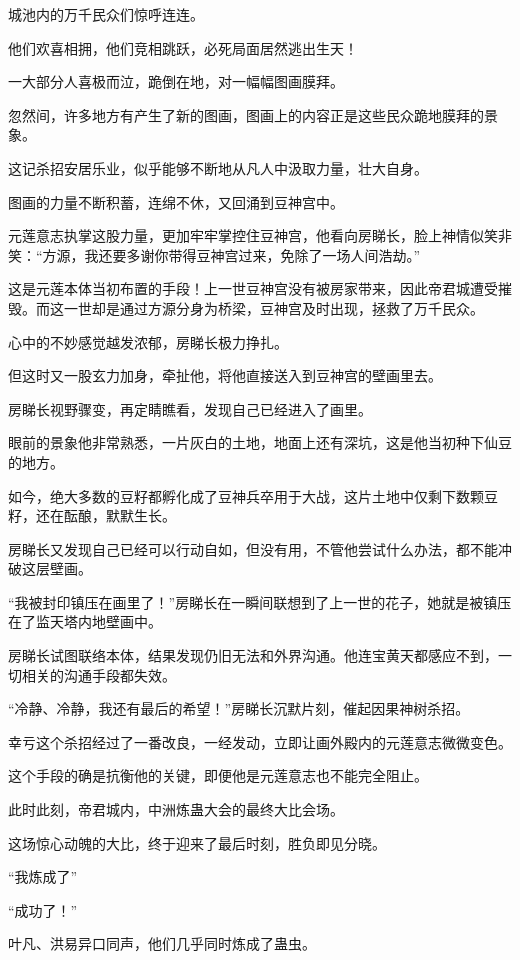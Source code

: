 \begin{this_body}
城池内的万千民众们惊呼连连。

他们欢喜相拥，他们竞相跳跃，必死局面居然逃出生天！

一大部分人喜极而泣，跪倒在地，对一幅幅图画膜拜。

忽然间，许多地方有产生了新的图画，图画上的内容正是这些民众跪地膜拜的景象。

这记杀招安居乐业，似乎能够不断地从凡人中汲取力量，壮大自身。

图画的力量不断积蓄，连绵不休，又回涌到豆神宫中。

元莲意志执掌这股力量，更加牢牢掌控住豆神宫，他看向房睇长，脸上神情似笑非笑：“方源，我还要多谢你带得豆神宫过来，免除了一场人间浩劫。”

这是元莲本体当初布置的手段！上一世豆神宫没有被房家带来，因此帝君城遭受摧毁。而这一世却是通过方源分身为桥梁，豆神宫及时出现，拯救了万千民众。

心中的不妙感觉越发浓郁，房睇长极力挣扎。

但这时又一股玄力加身，牵扯他，将他直接送入到豆神宫的壁画里去。

房睇长视野骤变，再定睛瞧看，发现自己已经进入了画里。

眼前的景象他非常熟悉，一片灰白的土地，地面上还有深坑，这是他当初种下仙豆的地方。

如今，绝大多数的豆籽都孵化成了豆神兵卒用于大战，这片土地中仅剩下数颗豆籽，还在酝酿，默默生长。

房睇长又发现自己已经可以行动自如，但没有用，不管他尝试什么办法，都不能冲破这层壁画。

“我被封印镇压在画里了！”房睇长在一瞬间联想到了上一世的花子，她就是被镇压在了监天塔内地壁画中。

房睇长试图联络本体，结果发现仍旧无法和外界沟通。他连宝黄天都感应不到，一切相关的沟通手段都失效。

“冷静、冷静，我还有最后的希望！”房睇长沉默片刻，催起因果神树杀招。

幸亏这个杀招经过了一番改良，一经发动，立即让画外殿内的元莲意志微微变色。

这个手段的确是抗衡他的关键，即便他是元莲意志也不能完全阻止。

此时此刻，帝君城内，中洲炼蛊大会的最终大比会场。

这场惊心动魄的大比，终于迎来了最后时刻，胜负即见分晓。

“我炼成了”

“成功了！”

叶凡、洪易异口同声，他们几乎同时炼成了蛊虫。


\end{this_body}
